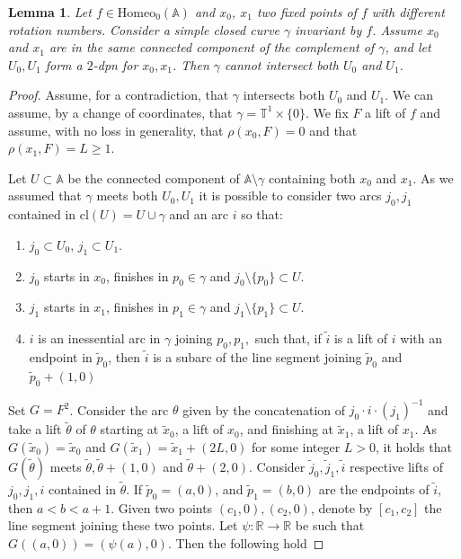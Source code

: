 \documentclass[12pt,a4paper]{amsart}
\newtheorem{lemma}[thm]{Lemma}
\theoremstyle{definition}
\theoremstyle{remark}
\newcommand{\T}{\mathbb{T}}
\newcommand{\R}{\mathbb{R}}
\newcommand{\A}{\mathbb{A}}
\begin{document}
\begin{lemma}\label{casocurva}
Let $f\in\mathrm{Homeo}_0(\A)$ and $x_0$, $x_1$ two fixed points of $f$ with different rotation numbers. Consider 
a simple closed curve $\gamma$ invariant by $f$. Assume $x_0$ and $x_1$ are in the same connected component of the complement of $\gamma$, and let $U_0,U_1$ form a $2$-dpn for $x_0,x_1$. Then $\gamma$ cannot intersect both $U_0$ and $U_1$.
\end{lemma}
\begin{proof}
Assume, for a contradiction, that $\gamma$ intersects both $U_0$ and $U_1$. We can assume, by a change of coordinates, that $\gamma=\T^1\times\{0\}$. We fix $F$ a lift of $f$ and assume, with no loss in generality, that $\rho(x_0,F)=0$ and that $\rho(x_1,F)=L\ge 1$.

Let $U\subset\A$ be the connected component of $\A\setminus \gamma$ containing
both $x_0$ and $x_1$. As we assumed that $\gamma$ meets both
$U_0,U_1$ it is possible to consider two arcs $j_0,j_1$
contained in $\textrm{cl}(U)=U \cup \gamma$ and an arc $i$ so that:
\begin{enumerate}
\item $j_0\subset U_0$, $j_1\subset U_1$.
\item $j_0$ starts in $x_0$, finishes in $p_0\in\gamma$ and
$j_0\setminus \{p_0\}\subset U$.
\item $j_1$ starts in $x_1$, finishes in $p_1\in\gamma$ and
$j_1\setminus \{p_1\}\subset U$.
\item $i$ is an inessential arc in $\gamma$ joining $p_0,p_1,$ such that, if $\widetilde i$ is a lift of $i$ with an endpoint in $\widetilde p_0$, then $\widetilde i$ is a subarc of the line segment joining $\widetilde p_0$ and $\widetilde p_0+(1,0)$
\end{enumerate}

Set $G=F^2$. Consider the arc $\theta$ given by the concatenation of $j_0\cdot i\cdot (j_1)^{-1}$ and take a lift
$\widetilde{\theta}$ of $\theta$ starting at $\widetilde{x}_0$, a lift of $x_0$, and finishing
at $\widetilde{x}_1$, a lift of $x_1$. As $G(\widetilde{x}_0)=\widetilde{x}_0$ and
$G(\widetilde{x}_1)=\widetilde{x}_1+(2L,0)$ for some integer $L>0$, it holds that $G(\widetilde{\theta})$ meets
$\widetilde{\theta},\widetilde{\theta}+(1,0)$ and $\widetilde{\theta}+(2,0)$. Consider
$\widetilde{j}_0,\widetilde{j}_1,\widetilde{i}$ respective lifts of $j_0, j_1, i$ contained in $\widetilde{\theta}$.
If $\widetilde{p}_0=(a,0)$, and $\widetilde{p}_1=(b,0)$ are the endpoints of $\widetilde{i}$, then $a<b<a+1$. Given two points $(c_1,0), (c_2,0)$, denote by $[c_1, c_2]$ the line segment joining these two points. Let $\psi:\R\to\R$ be such that $G((a,0))=(\psi(a),0)$. Then the following hold


\end{proof}
\end{document}
